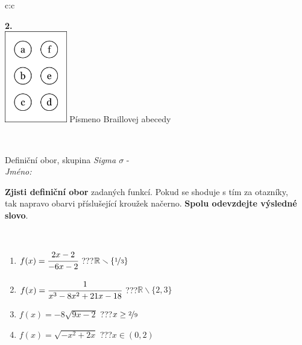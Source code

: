 \documentclass[10pt]{report}
\begin{document}
\begin{tabular}{c:c}
\begin{minipage}[c][104.5mm][t]{0.5\linewidth}
\begin{center}
\begin{minipage}{0.20\linewidth}
\begin{center}
{\Huge\bfseries 2.} \\[2mm]
\includegraphics[height=40mm]{../images/braille.png}
{\small Písmeno Braillovej abecedy}
\end{center}
\end{minipage}
\end{center}
\end{minipage}
\\ \hdashline
\begin{minipage}[c][104.5mm][t]{0.5\linewidth}
\begin{center}
\vspace{7mm}
{\huge Definiční obor, skupina \textit{Sigma $\sigma$} -}\\[5mm]
\textit{Jméno:}\phantom{xxxxxxxxxxxxxxxxxxxxxxxxxxxxxxxxxxxxxxxxxxxxxxxxxxxxxxxxxxxxxxxxx}\\[5mm]
\begin{minipage}{0.95\linewidth}
\begin{center}
\textbf{Zjisti definiční obor} zadaných funkcí. Pokud se shoduje s tím za otazníky,\\tak napravo obarvi příslušející kroužek načerno. \textbf{Spolu odevzdejte výsledné slovo}.
\end{center}
\end{minipage}
\\[1mm]
\begin{minipage}{0.79\linewidth}
\begin{center}
\begin{varwidth}{\linewidth}
\begin{enumerate}
\normalsizerrr
\item $f(x)=\cfrac{2x-2}{-6x-2}$\quad \dotfill\; ???\;\dotfill \quad $\mathbb{R}\smallsetminus\{\nicefrac{1}{3}\}$
\item $f(x)=\cfrac{1}{x^3-8x^2+21x-18}$\quad \dotfill\; ???\;\dotfill \quad $\mathbb{R}\smallsetminus\{2,3\}$
\item $f(x)=-8\sqrt{9x-2}$\quad \dotfill\; ???\;\dotfill \quad $x\geq\nicefrac{2}{9}$
\item $f(x)=\sqrt{-x^2+2x}$\quad \dotfill\; ???\;\dotfill \quad $x\in(0 , 2)$

\end{enumerate}
\end{varwidth}
\end{center}
\end{minipage}
\end{center}
\end{minipage}
\end{tabular}
\end{document}
